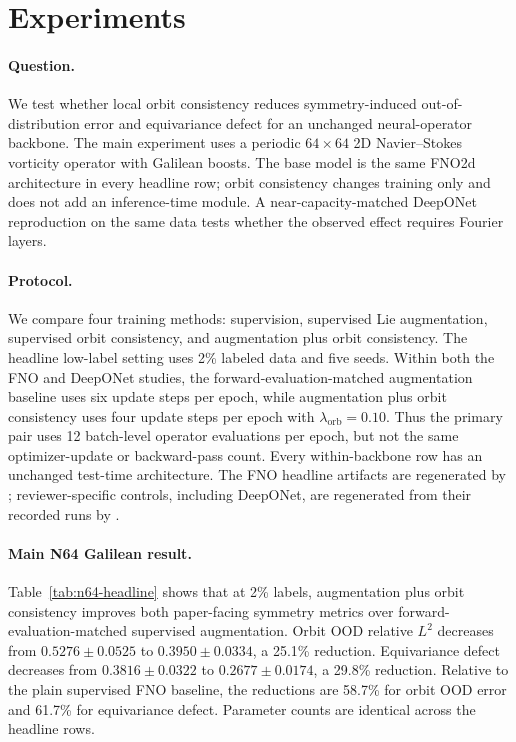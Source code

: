 \section{Experiments}
\label{sec:experiments}

\paragraph{Question.} We test whether local orbit consistency reduces symmetry-induced out-of-distribution error and equivariance defect for an unchanged neural-operator backbone. The main experiment uses a periodic \(64\times64\) 2D Navier--Stokes vorticity operator with Galilean boosts. The base model is the same FNO2d architecture in every headline row; orbit consistency changes training only and does not add an inference-time module. A near-capacity-matched DeepONet reproduction on the same data tests whether the observed effect requires Fourier layers.

\paragraph{Protocol.} We compare four training methods: supervision, supervised Lie augmentation, supervised orbit consistency, and augmentation plus orbit consistency. The headline low-label setting uses 2\% labeled data and five seeds. Within both the FNO and DeepONet studies, the forward-evaluation-matched augmentation baseline uses six update steps per epoch, while augmentation plus orbit consistency uses four update steps per epoch with \(\lambda_{\mathrm{orb}}=0.10\). Thus the primary pair uses 12 batch-level operator evaluations per epoch, but not the same optimizer-update or backward-pass count. Every within-backbone row has an unchanged test-time architecture. The FNO headline artifacts are regenerated by ; reviewer-specific controls, including DeepONet, are regenerated from their recorded runs by .



\paragraph{Main N64 Galilean result.} Table~\ref{tab:n64-headline} shows that at 2\% labels, augmentation plus orbit consistency improves both paper-facing symmetry metrics over forward-evaluation-matched supervised augmentation. Orbit OOD relative \(L^2\) decreases from \(0.5276\pm0.0525\) to \(0.3950\pm0.0334\), a 25.1\% reduction. Equivariance defect decreases from \(0.3816\pm0.0322\) to \(0.2677\pm0.0174\), a 29.8\% reduction. Relative to the plain supervised FNO baseline, the reductions are 58.7\% for orbit OOD error and 61.7\% for equivariance defect. Parameter counts are identical across the headline rows.


